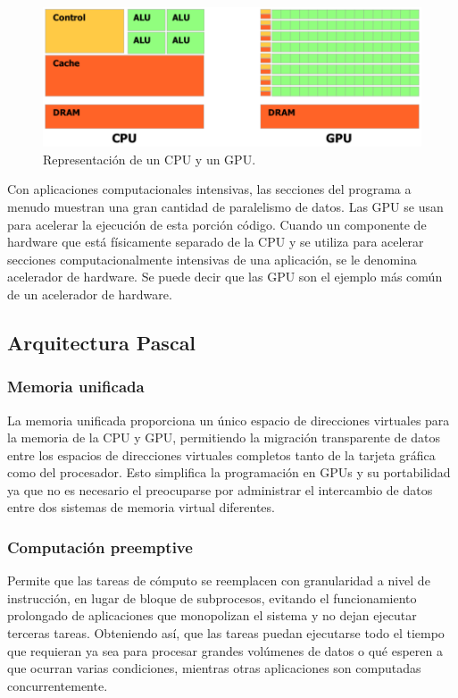         \begin{figure}[ht]
      \centering
        \includegraphics[scale=0.35]{img/repCPUGPU}
        \caption{Representación de un CPU y un GPU\cite{NCUDA}.}
        \label{fig:gpgpu}
    \end{figure}
    
    \vspace{0.3cm}
    Con aplicaciones computacionales intensivas, las secciones del programa a menudo muestran una gran cantidad de paralelismo de datos. Las GPU se usan para acelerar la ejecución de esta porción código. Cuando un componente de hardware que está físicamente separado de la CPU y se utiliza para acelerar secciones computacionalmente intensivas de una aplicación, se le denomina acelerador de hardware. Se puede decir que las GPU son el ejemplo más común de un acelerador de hardware.

    \subsection{Arquitectura Pascal}

     
    \subsubsection{Memoria unificada} 
     La memoria unificada proporciona un único espacio de direcciones virtuales para la memoria de la CPU y GPU, permitiendo la migración transparente de datos entre los espacios de direcciones virtuales completos tanto de la tarjeta gráfica como del procesador. Esto simplifica la programación en GPUs y su portabilidad ya que no es necesario el  preocuparse por administrar el intercambio de datos entre dos sistemas de memoria virtual diferentes\cite{WPNV}.
     
     
    \subsubsection{Computación preemptive}
    Permite que las tareas de cómputo se reemplacen con granularidad a nivel de instrucción, en lugar de bloque de subprocesos, evitando el funcionamiento prolongado de aplicaciones que monopolizan el sistema y no dejan ejecutar terceras tareas\cite{WPNV}. Obteniendo así, que las tareas puedan ejecutarse todo el tiempo que requieran ya sea para procesar grandes volúmenes de datos o qué esperen a que ocurran varias condiciones, mientras otras aplicaciones son computadas concurrentemente.

